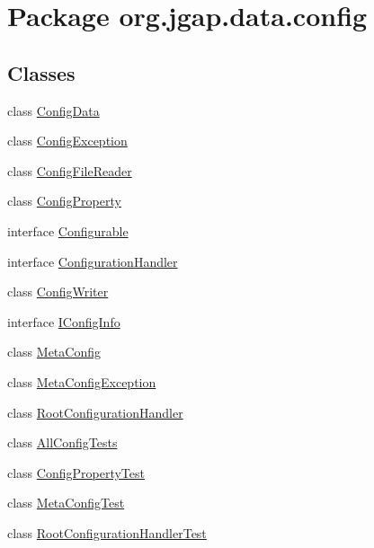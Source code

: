 \hypertarget{namespaceorg_1_1jgap_1_1data_1_1config}{\section{Package org.\-jgap.\-data.\-config}
\label{namespaceorg_1_1jgap_1_1data_1_1config}
}
\subsection*{Classes}
\begin{DoxyCompactItemize}
\item 
class \hyperlink{classorg_1_1jgap_1_1data_1_1config_1_1_config_data}{Config\-Data}
\item 
class \hyperlink{classorg_1_1jgap_1_1data_1_1config_1_1_config_exception}{Config\-Exception}
\item 
class \hyperlink{classorg_1_1jgap_1_1data_1_1config_1_1_config_file_reader}{Config\-File\-Reader}
\item 
class \hyperlink{classorg_1_1jgap_1_1data_1_1config_1_1_config_property}{Config\-Property}
\item 
interface \hyperlink{interfaceorg_1_1jgap_1_1data_1_1config_1_1_configurable}{Configurable}
\item 
interface \hyperlink{interfaceorg_1_1jgap_1_1data_1_1config_1_1_configuration_handler}{Configuration\-Handler}
\item 
class \hyperlink{classorg_1_1jgap_1_1data_1_1config_1_1_config_writer}{Config\-Writer}
\item 
interface \hyperlink{interfaceorg_1_1jgap_1_1data_1_1config_1_1_i_config_info}{I\-Config\-Info}
\item 
class \hyperlink{classorg_1_1jgap_1_1data_1_1config_1_1_meta_config}{Meta\-Config}
\item 
class \hyperlink{classorg_1_1jgap_1_1data_1_1config_1_1_meta_config_exception}{Meta\-Config\-Exception}
\item 
class \hyperlink{classorg_1_1jgap_1_1data_1_1config_1_1_root_configuration_handler}{Root\-Configuration\-Handler}
\item 
class \hyperlink{classorg_1_1jgap_1_1data_1_1config_1_1_all_config_tests}{All\-Config\-Tests}
\item 
class \hyperlink{classorg_1_1jgap_1_1data_1_1config_1_1_config_property_test}{Config\-Property\-Test}
\item 
class \hyperlink{classorg_1_1jgap_1_1data_1_1config_1_1_meta_config_test}{Meta\-Config\-Test}
\item 
class \hyperlink{classorg_1_1jgap_1_1data_1_1config_1_1_root_configuration_handler_test}{Root\-Configuration\-Handler\-Test}
\end{DoxyCompactItemize}
